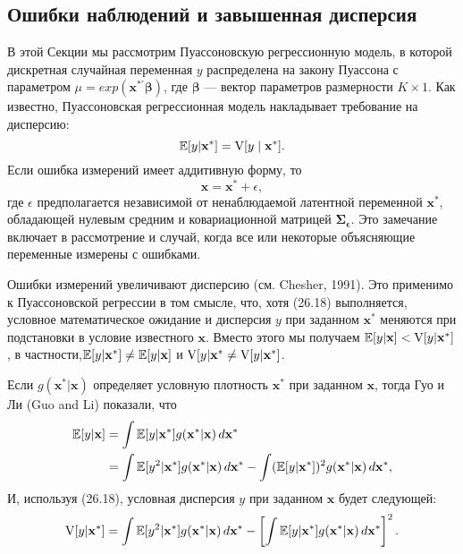 \subsection*{Ошибки наблюдений и завышенная дисперсия} 
В этой Секции мы рассмотрим Пуассоновскую регрессионную модель, в которой дискретная случайная переменная $y$ распределена на закону Пуассона с параметром $\mu = exp(\mathbf{x^{*\prime} \beta})$, где $\mathbf{\beta}$ --- вектор параметров размерности $K \times 1$. Как известно, Пуассоновская регрессионная модель накладывает требование на дисперсию:
\begin{equation}
\mathbb{E}[y| \mathbf{x^*}]=\mathrm{V}[y \mid  \mathbf{x^*}].
\end{equation} 
Если ошибка измерений имеет аддитивную форму, то
\[
\mathbf{x}=\mathbf{x^*}+ \epsilon,
\]
где $\epsilon$ предполагается независимой от ненаблюдаемой латентной переменной $\mathbf{x^*}$, обладающей нулевым средним и ковариационной матрицей $\mathbf{\Sigma_{\epsilon}}$. Это замечание включает в рассмотрение и случай, когда все или некоторые объясняющие переменные измерены с ошибками.

Ошибки измерений увеличивают дисперсию (см. Chesher, 1991). Это применимо к Пуассоновской регрессии в том смысле, что, хотя (26.18) выполняется, условное математическое ожидание и дисперсия $y$ при заданном $\mathbf{x^*}$ меняются при подстановки в условие известного $\mathbf{x}$. Вместо этого мы получаем $\mathbb{E}[y| \mathbf{x}]<\mathrm{V}[y| \mathbf{x^*}]$, в частности,$\mathbb{E}[y| \mathbf{x^*}] \neq \mathbb{E}[y| \mathbf{x}]$  и $\mathrm{V}[y| \mathbf{x^*} \neq \mathrm{V}[y| \mathbf{x^*}]$.

Если $g(\mathbf{x^*|x})$ определяет условную плотность $\mathbf{x^*}$ при заданном $\mathbf{x}$, тогда Гуо и Ли (Guo and Li) показали, что
\begin{align}
\mathbb{E}[y| \mathbf{x}] &= \int \mathbb{E}[y| \mathbf{x^*}]g(\mathbf{x^*|x})\, d\mathbf{x^*} \notag \\
&= \int \mathbb{E}[y^2| \mathbf{x^*}]g(\mathbf{x^*|x})\, d\mathbf{x^*} - \int (\mathbb{E}[y| \mathbf{x^*}])^2 g(\mathbf{x^*|x})\, d\mathbf{x^*},
\end{align}
И, используя (26.18), условная дисперсия $y$ при заданном $\mathbf{x}$ будет следующей:
\begin{equation}
\mathrm{V}[y| \mathbf{x^*}]= \int \mathbb{E}[y^2| \mathbf{x^*}]g(\mathbf{x^*|x})\, d\mathbf{x^*} -  \left[ \int \mathbb{E}[y| \mathbf{x^*}]g(\mathbf{x^*|x})\, d\mathbf{x^*} \right]^2.
\end{equation}

